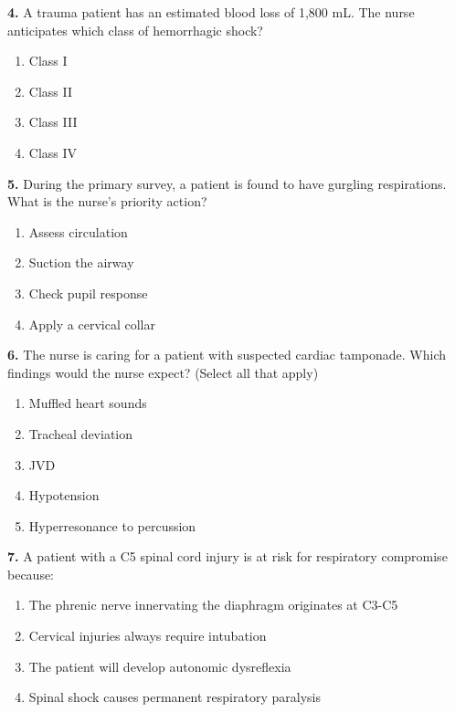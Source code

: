 \documentclass[11pt]{article}
\begin{document}
\vspace{0.3cm}

\textbf{4.} A trauma patient has an estimated blood loss of 1,800 mL. The nurse anticipates which class of hemorrhagic shock?

\begin{enumerate}[label=\Alph*.]
    \item Class I
    \item Class II
    \item Class III
    \item Class IV
\end{enumerate}

\vspace{0.3cm}

\textbf{5.} During the primary survey, a patient is found to have gurgling respirations. What is the nurse's priority action?

\begin{enumerate}[label=\Alph*.]
    \item Assess circulation
    \item Suction the airway
    \item Check pupil response
    \item Apply a cervical collar
\end{enumerate}

\vspace{0.3cm}

\textbf{6.} The nurse is caring for a patient with suspected cardiac tamponade. Which findings would the nurse expect? (Select all that apply)

\begin{enumerate}[label=\Alph*.]
    \item Muffled heart sounds
    \item Tracheal deviation
    \item JVD
    \item Hypotension
    \item Hyperresonance to percussion
\end{enumerate}

\vspace{0.3cm}

\textbf{7.} A patient with a C5 spinal cord injury is at risk for respiratory compromise because:

\begin{enumerate}[label=\Alph*.]
    \item The phrenic nerve innervating the diaphragm originates at C3-C5
    \item Cervical injuries always require intubation
    \item The patient will develop autonomic dysreflexia
    \item Spinal shock causes permanent respiratory paralysis
\end{enumerate}
\end{document}
